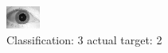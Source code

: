 \begin{figure}[h!]
\begin{center}
\includegraphics[width=0.60\columnwidth]{figures/ID1738_class_3_target_2.png}
\end{center}
\caption{ Classification: 3 actual target: 2}
\label{fig:ID1738_class_3_target_2}
\end{figure}
